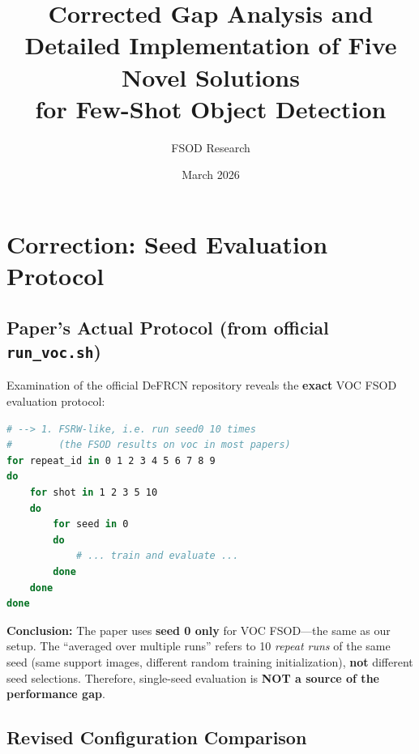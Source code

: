 \documentclass[11pt,a4paper]{article}
\title{\textbf{Corrected Gap Analysis and \\
Detailed Implementation of Five Novel Solutions \\
for Few-Shot Object Detection}}
\author{FSOD Research}
\date{March 2026}
\begin{document}
\maketitle

\section{Correction: Seed Evaluation Protocol}

\subsection{Paper's Actual Protocol (from official \texttt{run\_voc.sh})}

Examination of the official DeFRCN repository reveals the \textbf{exact} VOC FSOD evaluation protocol:

\begin{lstlisting}[language=bash,caption={Official DeFRCN VOC FSOD protocol}]
# --> 1. FSRW-like, i.e. run seed0 10 times
#        (the FSOD results on voc in most papers)
for repeat_id in 0 1 2 3 4 5 6 7 8 9
do
    for shot in 1 2 3 5 10
    do
        for seed in 0
        do
            # ... train and evaluate ...
        done
    done
done
\end{lstlisting}

\textbf{Conclusion:} The paper uses \textbf{seed 0 only} for VOC FSOD---the same as our setup. The ``averaged over multiple runs'' refers to 10 \textit{repeat runs} of the same seed (same support images, different random training initialization), \textbf{not} different seed selections. Therefore, single-seed evaluation is \textbf{NOT a source of the performance gap}.

\subsection{Revised Configuration Comparison}
\end{document}
